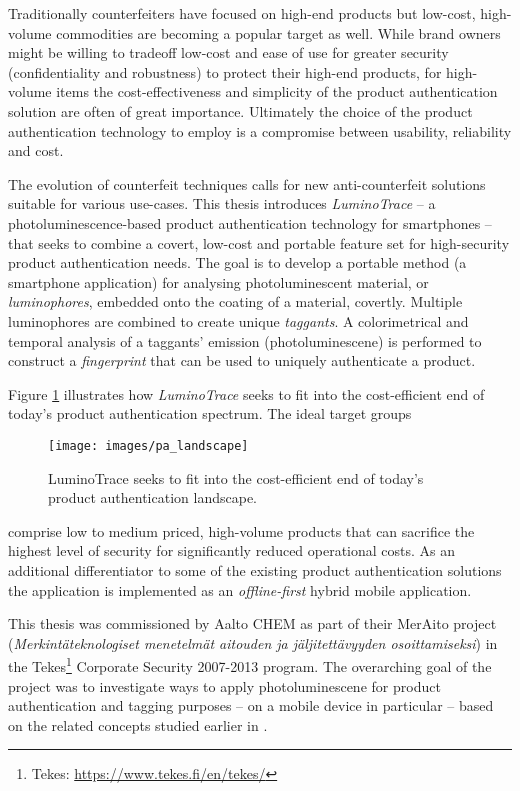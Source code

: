 \documentclass[thesis.tex]{subfiles}
\begin{document}
Traditionally counterfeiters have focused on high-end products but low-cost, high-volume commodities are becoming a popular target as well. While brand owners might be willing to tradeoff low-cost and ease of use for greater security (confidentiality and robustness) to protect their high-end products, for high-volume items the cost-effectiveness and simplicity of the product authentication solution are often of great importance. Ultimately the choice of the product authentication technology to employ is a compromise between usability, reliability and cost.

\enlargethispage{2\baselineskip}
The evolution of counterfeit techniques calls for new anti-counterfeit solutions suitable for various use-cases. This thesis introduces \emph{LuminoTrace} -- a photoluminescence-based product authentication technology for smartphones -- that seeks to combine a covert, low-cost and portable feature set for high-security product authentication needs. The goal is to develop a portable method (a smartphone application) for analysing photoluminescent material, or \emph{luminophores}, embedded onto the coating of a material, covertly. Multiple luminophores are combined to create unique \emph{taggants}. A colorimetrical and temporal analysis of a taggants' emission (photoluminescene) is performed to construct a \emph{fingerprint} that can be used to uniquely authenticate a product.

Figure \ref{figure:production_authentication_landscape} illustrates how \emph{LuminoTrace} seeks to fit into the cost-efficient end of today's product authentication spectrum. The ideal target groups

\begin{figure}[h!]
\centering \texttt{[image: images/pa\_landscape]}
\vspace{-8mm}
\caption{LuminoTrace seeks to fit into the cost-efficient end of today's product authentication landscape.}
\label{figure:production_authentication_landscape}
\end{figure}
\clearpage

\noindent comprise low to medium priced, high-volume products that can sacrifice the highest level of security for significantly reduced operational costs. As an additional differentiator to some of the existing product authentication solutions the application is implemented as an \emph{offline-first} hybrid mobile application.

This thesis was commissioned by Aalto CHEM as part of their MerAito project (\emph{Merkintäteknologiset menetelmät aitouden ja jäljitettävyyden osoittamiseksi}) in the Tekes\footnote{Tekes: \url{https://www.tekes.fi/en/tekes/}} Corporate Security 2007-2013 program. The overarching goal of the project was to investigate ways to apply photoluminescene for product authentication and tagging purposes -- on a mobile device in particular -- based on the related concepts studied earlier in \cite{kuosmanen}.
\end{document}
